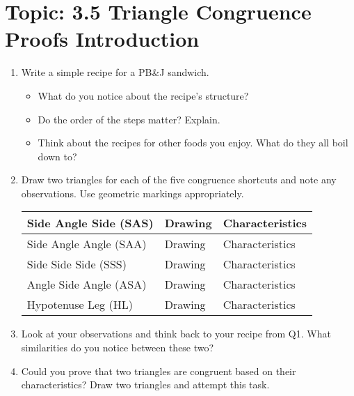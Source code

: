 \documentclass[12pt,letterpaper]{article}
\begin{document}
\section*{Topic: 3.5 Triangle Congruence Proofs Introduction}
\begin{enumerate}
    \item Write a simple recipe for a PB\&J sandwich.
          \begin{itemize}
              \item What do you notice about the recipe's structure?
              \item Do the order of the steps matter? Explain.
              \item Think about the recipes for other foods you enjoy. What do they all boil down to?
          \end{itemize}
    \item Draw two triangles for each of the five congruence shortcuts and note any observations. Use geometric markings appropriately.

          \begin{tabularx}{0.95\textwidth} {
                  | >{\centering\arraybackslash}X
                  | >{\centering\arraybackslash}X
                  | >{\centering\arraybackslash}X |}
              \hline
              Side Angle Side (SAS)\vspace{25mm}  & Drawing & Characteristics \\
              \hline
              Side Angle Angle (SAA)\vspace{25mm} & Drawing & Characteristics \\
              \hline
              Side Side Side (SSS)\vspace{25mm}   & Drawing & Characteristics \\
              \hline
              Angle Side Angle (ASA)\vspace{25mm} & Drawing & Characteristics \\
              \hline
              Hypotenuse Leg (HL)\vspace{25mm}    & Drawing & Characteristics \\
              \hline
          \end{tabularx}
    \item Look at your observations and think back to your recipe from Q1. What similarities do you notice between these two?
    \item Could you prove that two triangles are congruent based on their characteristics? Draw two triangles and attempt this task.

\end{enumerate}
\end{document}
